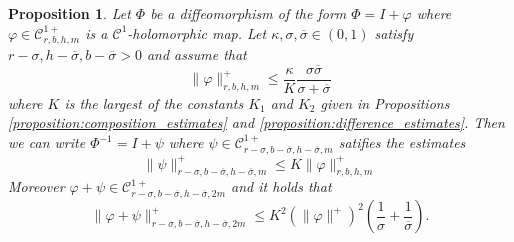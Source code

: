 \documentclass[10pt]{article}
\newtheorem{proposition}[theorem]{Proposition}
\begin{document}
\begin{proposition}
\label{proposition:inverse_estimates}
 Let $\Phi$ be a diffeomorphism of the form $\Phi=I+\varphi$ where $\varphi\in\mathscr C^{1+}_{r,b,h,m}$ is a $\mathscr C^1$-holomorphic map. Let $\kappa,\sigma,\overline\sigma\in(0,1)$ satisfy $r-\sigma,h-\overline\sigma,b-\overline\sigma>0$ and assume that 
 \begin{equation}
 \label{equation:assumption_inverse}
 \|\varphi\|_{r,b,h,m}^+
 \leq
 \frac{\kappa}
 {K}\frac{\sigma\overline\sigma}{\sigma+\overline\sigma}
 \end{equation}
 where $K$ is the largest of the constants $K_1$ and $K_2$ given in Propositions \ref{proposition:composition_estimates} and \ref{proposition:difference_estimates}. Then we can write $\Phi^{-1} = I+\psi$ where 
 $\psi\in\mathscr C^{1+}_{r-\sigma,b-\overline\sigma,h-\overline\sigma,m}$
 satifies the estimates
 \begin{equation}
 \label{equation:norm_inverse}
 \|\psi\|_{r-\sigma,b-\overline\sigma,h-\overline\sigma,m}^+\leq K\|\varphi\|_{r,b,h,m}^+
 \end{equation}
 Moreover $\varphi+\psi\in\mathscr C^{1+}_{r-\sigma,b-\overline\sigma,h-\overline\sigma,2m}$ and it holds that
 \begin{equation}
 \label{equation:norm_inverse_plus_diffeo}
 \|\varphi+\psi\|_{r-\sigma,b-\overline\sigma,h-\overline\sigma,2m}^+ \leq K^2({\|\varphi\|^+})^2\left(\frac{1}{\sigma}+\frac{1}{\overline\sigma}\right).
 \end{equation}
\end{proposition}
\end{document}
